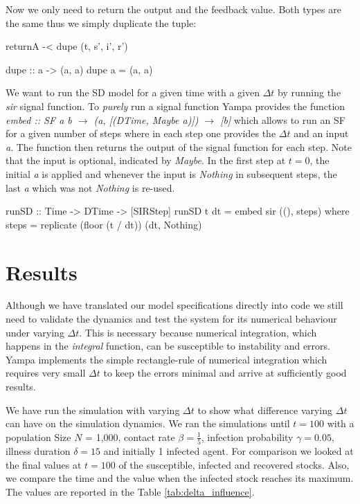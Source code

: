 Now we only need to return the output and the feedback value. Both types are the same thus we simply duplicate the tuple:

\begin{HaskellCode}
      returnA -< dupe (t, s', i', r')

    dupe :: a -> (a, a)
    dupe a = (a, a)
\end{HaskellCode}

We want to run the SD model for a given time with a given $\Delta t$ by running the \textit{sir} signal function. To \textit{purely} run a signal function Yampa provides the function \textit{embed :: SF a b $\rightarrow$ (a, [(DTime, Maybe a)]) $\rightarrow$ [b]} which allows to run an SF for a given number of steps where in each step one provides the $\Delta t$ and an input \textit{a}. The function then returns the output of the signal function for each step. Note that the input is optional, indicated by \textit{Maybe}. In the first step at $t = 0$, the initial \textit{a} is applied and whenever the input is \textit{Nothing} in subsequent steps, the last \textit{a} which was not \textit{Nothing} is re-used.

\begin{HaskellCode}
runSD :: Time -> DTime -> [SIRStep]
runSD t dt = embed sir ((), steps)
  where
    steps = replicate (floor (t / dt)) (dt, Nothing)
\end{HaskellCode}

\section{Results}
Although we have translated our model specifications directly into code we still need to validate the dynamics and test the system for its numerical behaviour under varying $\Delta t$. This is necessary because numerical integration, which happens in the \textit{integral} function, can be susceptible to instability and errors. Yampa implements the simple rectangle-rule of numerical integration which requires very small $\Delta t$ to keep the errors minimal and arrive at sufficiently good results. 

We have run the simulation with varying $\Delta t$ to show what difference varying $\Delta t$ can have on the simulation dynamics. We ran the simulations until $t = 100$ with a population Size $N$ = 1,000, contact rate $\beta = \frac{1}{5}$, infection probability $\gamma = 0.05$, illness duration $\delta = 15$ and initially 1 infected agent. For comparison we looked at the final values at $t = 100$ of the susceptible, infected and recovered stocks. Also, we compare the time and the value when the infected stock reaches its maximum. The values are reported in the Table \ref{tab:delta_influence}.

